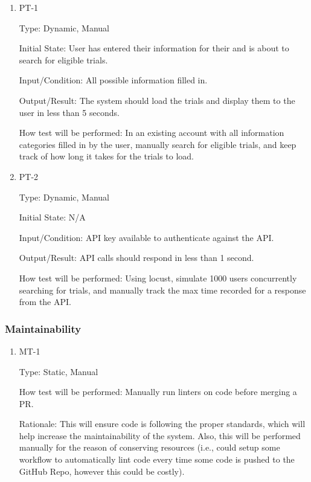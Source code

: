 \documentclass[12pt, titlepage]{article}
\begin{document}
\begin{enumerate}

\item{PT-1\\}

Type: Dynamic, Manual
					
Initial State: User has entered their information for their and is about to search for eligible trials.
					
Input/Condition: All possible information filled in.
					
Output/Result: The system should load the trials and display them to the user in less than 5 seconds.
					
How test will be performed: In an existing account with all information categories filled in by the user, manually search for eligible trials, 
and keep track of how long it takes for the trials to load.
					
\item{PT-2\\}

Type: Dynamic, Manual
					
Initial State: N/A
					
Input/Condition: API key available to authenticate against the API.
					
Output/Result: API calls should respond in less than 1 second.
					
How test will be performed: Using locust, simulate 1000 users concurrently searching for trials, and manually track 
the max time recorded for a response from the API.

\end{enumerate}

\subsubsection{Maintainability}

\begin{enumerate}

\item{MT-1\\}

Type: Static, Manual
					
How test will be performed: Manually run linters on code before merging a PR.

Rationale: This will ensure code is following the proper standards, which will help increase the maintainability of the system.
Also, this will be performed manually for the reason of conserving resources (i.e., could setup some workflow to automatically lint 
code every time some code is pushed to the GitHub Repo, however this could be costly).

\end{enumerate}
\end{document}
